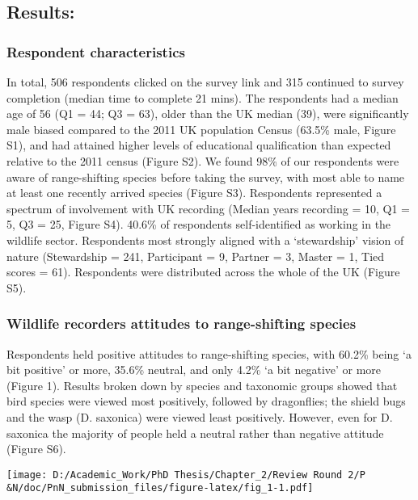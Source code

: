 \documentclass[
]{article}
\begin{document}
\hypertarget{results}{%
\subsection{Results:}\label{results}}

\hypertarget{respondent-characteristics}{%
\subsubsection{Respondent
characteristics}\label{respondent-characteristics}}

In total, 506 respondents clicked on the survey link and 315 continued
to survey completion (median time to complete 21 mins). The respondents
had a median age of 56 (Q1 = 44; Q3 = 63), older than the UK median
(39), were significantly male biased compared to the 2011 UK population
Census (63.5\% male, Figure S1), and had attained higher levels of
educational qualification than expected relative to the 2011 census
(Figure S2). We found 98\% of our respondents were aware of
range-shifting species before taking the survey, with most able to name
at least one recently arrived species (Figure S3). Respondents
represented a spectrum of involvement with UK recording (Median years
recording = 10, Q1 = 5, Q3 = 25, Figure S4). 40.6\% of respondents
self-identified as working in the wildlife sector. Respondents most
strongly aligned with a `stewardship' vision of nature (Stewardship =
241, Participant = 9, Partner = 3, Master = 1, Tied scores = 61).
Respondents were distributed across the whole of the UK (Figure S5).

\hypertarget{wildlife-recorders-attitudes-to-range-shifting-species}{%
\subsubsection{Wildlife recorders attitudes to range-shifting
species}\label{wildlife-recorders-attitudes-to-range-shifting-species}}

Respondents held positive attitudes to range-shifting species, with
60.2\% being `a bit positive' or more, 35.6\% neutral, and only 4.2\% `a
bit negative' or more (Figure 1). Results broken down by species and
taxonomic groups showed that bird species were viewed most positively,
followed by dragonflies; the shield bugs and the wasp (D. saxonica) were
viewed least positively. However, even for D. saxonica the majority of
people held a neutral rather than negative attitude (Figure S6).

\texttt{[image: D:/Academic\_Work/PhD Thesis/Chapter\_2/Review Round 2/P\\\&N/doc/PnN\_submission\_files/figure-latex/fig\_1-1.pdf]}
\end{document}
